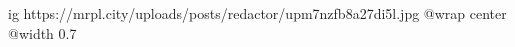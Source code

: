  
 
 
 
 

\ifcmt
  ig https://mrpl.city/uploads/posts/redactor/upm7nzfb8a27di5l.jpg
  @wrap center
  @width 0.7
\fi
